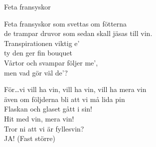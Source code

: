 \begin{song}{Feta fransyskor}
	

	
	Feta fransyskor som svettas om fötterna\\
	de trampar druvor som sedan skall jäsas till vin.\\
	Transpirationen viktig e’\\
	ty den ger fin bouquet\\
	Vårtor och svampar följer me’,\\
	men vad gör väl de’?
	
	För\dots vi vill ha vin, vill ha vin, vill ha mera vin\\
	även om följderna bli att vi må lida pin\\
	Flaskan och glaset gått i sin!\\
	Hit med vin, mera vin!\\
	Tror ni att vi är fyllesvin?\\
	JA! (Fast större)
	
\end{song}
